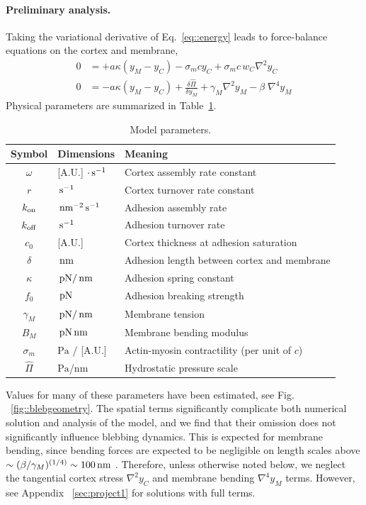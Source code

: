 \paragraph{Preliminary analysis.}
Taking the variational derivative of Eq.~\ref{eq::energy} leads to force-balance equations on the cortex and membrane,
\begin{align}
0 &= + a \kappa (y_M-y_C) - \sigma_m c y_C + \sigma_m c\, w_C \nabla^2  y_C \label{eq::forceBalanceCortex}\\
0 &= - a\kappa (y_M-y_C) + \frac{\delta \hat{\Pi}}{\delta y_M}  + \gamma_M \nabla^2  y_M - \beta\;\nabla^4 y_M \label{eq::forceBalanceMembrane}
\end{align}
Physical parameters are summarized in Table~\ref{tab:modelparameters}. 
\begin{table}[t!]
\caption{Model parameters.}\centering \label{tab:modelparameters} 
\begin{tabular}{ c  l  l}
\hline
Symbol & Dimensions & Meaning \\
\hline
$\omega$ & [A.U.] $\cdot \,\mbox{s}^{-1}$ & Cortex assembly rate constant  \\
$r$ & $\,\mbox{s}^{-1} $ & Cortex turnover rate constant \\
$k_{\mbox{\scriptsize on}}$ & $\,\mbox{nm}^{-2}\,\mbox{s}^{-1}$ & Adhesion assembly rate  \\
$k_{\mbox{\scriptsize off}} $& $ \,\mbox{s}^{-1}$ & Adhesion turnover rate \\
$c_0$ & [A.U.] & Cortex thickness at adhesion saturation \\
$\delta$ &  $\,\mbox{nm}$& Adhesion length between cortex and membrane \\
$\kappa$ & $\,\mbox{pN}/\,\mbox{nm}$ & Adhesion spring constant \\
$f_0$ & $\,\mbox{pN}$ &Adhesion breaking strength\\
$\gamma_M$ & $ \,\mbox{pN}/\,\mbox{nm}$ & Membrane tension \\
$B_M$& $\,\mbox{pN}\,\mbox{nm}$ & Membrane bending modulus \\
$\sigma_m$ & $ \mbox{Pa}$ / [A.U.] & Actin-myosin contractility (per unit of $c$) \\
$\hat\Pi$ & $ \mbox{Pa}$/nm & Hydrostatic pressure scale \\
\hline
\end{tabular}
\end{table}
Values for many of these parameters have been estimated, see Fig. ~\ref{fig::blebgeometry}. The spatial terms significantly complicate both numerical solution and analysis of the model, and we find that their omission does not significantly influence blebbing dynamics. This is expected for membrane bending, since bending forces are expected to be negligible on length scales above $\sim (\beta/\gamma_M)^{(1/4)}\sim100\,\mbox{nm}$ \cite{Allard:2012gy}. Therefore, unless otherwise noted below, we neglect the tangential cortex stress $\nabla^2y_C$ and membrane bending $\nabla^4 y_M$ terms. However, see Appendix ~\ref{sec:project1} for solutions with full terms. 

